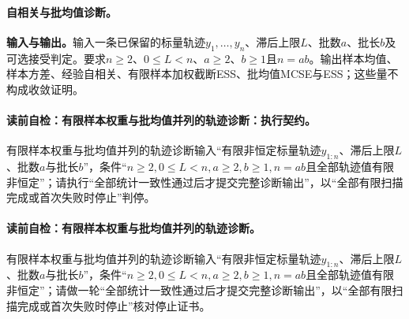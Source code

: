 \paragraph{自相关与批均值诊断。}
\textbf{输入与输出。}输入一条已保留的标量轨迹$y_1,\ldots,y_n$、滞后上限$L$、批数$a$、批长$b$及可选接受判定。要求$n\ge2$、$0\le L<n$、$a\ge2$、$b\ge1$且$n=ab$。输出样本均值、样本方差、经验自相关、有限样本加权截断ESS、批均值MCSE与ESS；这些量不构成收敛证明。

\begingroup
{}
\paragraph{读前自检：有限样本权重与批均值并列的轨迹诊断：执行契约。}有限样本权重与批均值并列的轨迹诊断输入“有限非恒定标量轨迹$y_{1:n}$、滞后上限$L$、批数$a$与批长$b$”，条件“$n\ge2,0\le L<n,a\ge2,b\ge1,n=ab$且全部轨迹值有限非恒定”；请执行“全部统计一致性通过后才提交完整诊断输出”，以“全部有限扫描完成或首次失败时停止”判停。\par
\paragraph{读前自检：有限样本权重与批均值并列的轨迹诊断。}有限样本权重与批均值并列的轨迹诊断输入“有限非恒定标量轨迹$y_{1:n}$、滞后上限$L$、批数$a$与批长$b$”，条件“$n\ge2,0\le L<n,a\ge2,b\ge1,n=ab$且全部轨迹值有限非恒定”；请做一轮“全部统计一致性通过后才提交完整诊断输出”，以“全部有限扫描完成或首次失败时停止”核对停止证书。\par


